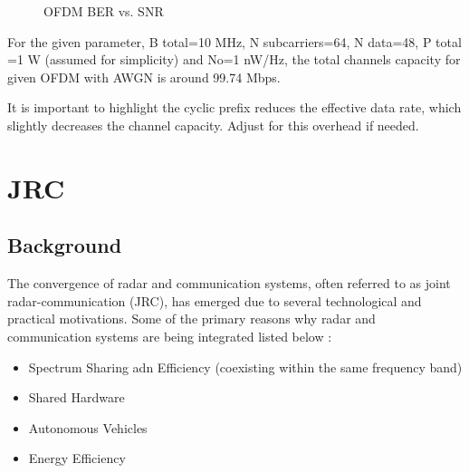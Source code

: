 \documentclass[conference]{IEEEtran}
\begin{document}
    \begin{figure}[H]
		\centering
    		\caption{OFDM BER vs. SNR}
  	  \end{figure}    
  	  
  	  For the given parameter, B total=10 MHz, N subcarriers=64, N data=48, P total =1 W (assumed for simplicity) and No=1 nW/Hz, the total channels capacity for given OFDM  with AWGN is around 99.74 Mbps. \par
  	 It is important to highlight the cyclic prefix reduces the effective data rate, which slightly decreases the channel capacity. Adjust for this overhead if needed.
 
  	  
    
    \section {JRC}
		 \subsection {Background}
		 
 The convergence of radar and communication systems, often referred to as joint radar-communication (JRC), has emerged due to several technological and practical motivations. Some of the primary reasons why radar and communication systems are being integrated listed below :
 
 \begin{itemize}
 \item Spectrum Sharing adn Efficiency (coexisting within the same frequency band)
\item Shared Hardware
\item Autonomous Vehicles
\item Energy Efficiency		 
\end{itemize}		 
		 
\end{document}
